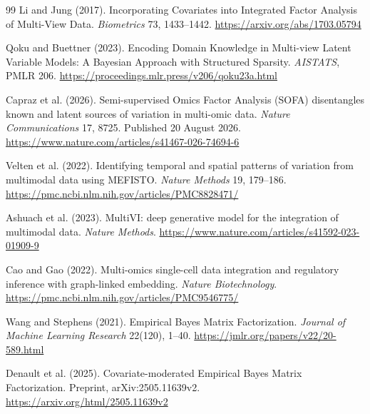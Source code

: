 \documentclass[11pt,a4paper]{article}
\numberwithin{equation}{section}
\begin{document}
\begin{thebibliography}{99}
Li and Jung (2017).
Incorporating Covariates into Integrated Factor Analysis of Multi-View
Data. \emph{Biometrics} 73, 1433--1442.
\url{https://arxiv.org/abs/1703.05794}

Qoku and Buettner (2023).
Encoding Domain Knowledge in Multi-view Latent Variable Models:
A Bayesian Approach with Structured Sparsity. \emph{AISTATS}, PMLR 206.
\url{https://proceedings.mlr.press/v206/qoku23a.html}

Capraz et al. (2026).
Semi-supervised Omics Factor Analysis (SOFA) disentangles known and latent
sources of variation in multi-omic data.
\emph{Nature Communications} 17, 8725. Published 20 August 2026.
\url{https://www.nature.com/articles/s41467-026-74694-6}

Velten et al. (2022).
Identifying temporal and spatial patterns of variation from multimodal
data using MEFISTO. \emph{Nature Methods} 19, 179--186.
\url{https://pmc.ncbi.nlm.nih.gov/articles/PMC8828471/}

Ashuach et al. (2023).
MultiVI: deep generative model for the integration of multimodal data.
\emph{Nature Methods}.
\url{https://www.nature.com/articles/s41592-023-01909-9}

Cao and Gao (2022).
Multi-omics single-cell data integration and regulatory inference with
graph-linked embedding. \emph{Nature Biotechnology}.
\url{https://pmc.ncbi.nlm.nih.gov/articles/PMC9546775/}

Wang and Stephens (2021).
Empirical Bayes Matrix Factorization.
\emph{Journal of Machine Learning Research} 22(120), 1--40.
\url{https://jmlr.org/papers/v22/20-589.html}

Denault et al. (2025).
Covariate-moderated Empirical Bayes Matrix Factorization.
Preprint, arXiv:2505.11639v2.
\url{https://arxiv.org/html/2505.11639v2}
\end{thebibliography}
\endgroup
\end{document}
